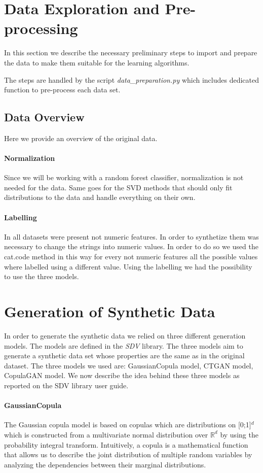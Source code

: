\documentclass{article}
\begin{document}
\section{Data Exploration and Pre-processing}
In this section we describe the necessary preliminary steps to import and prepare the data to make them suitable for the learning algorithms.

The steps are handled by the script \textit{data\_preparation.py} which includes dedicated function to pre-process each data set.

\subsection{Data Overview}
Here we provide an overview of the original data.

\paragraph{Normalization}
Since we will be working with a random forest classifier, normalization is not needed for the data. Same goes for the SVD methods that should only fit distributions to the data and handle everything on their own.

\paragraph{Labelling}
In all datasets were present not numeric features. In order to synthetize them was necessary to change the strings into numeric values. In order to do so we used the cat.code method in this way for every not numeric features all the possible values where labelled using a different value. Using the labelling we had the possibility to use the three models.

\section{Generation of Synthetic Data} \label{sec::synthetic}
In order to generate the synthetic data we relied on three different generation models. The models are defined in the \textit{SDV} library. The three models aim to generate a synthetic data set whose properties are the same as in the original dataset. The three models we used are: GaussianCopula model, CTGAN model, CopulaGAN model.
We now describe the idea behind these three models as reported on the SDV library user guide.

\paragraph{GaussianCopula}
The Gaussian copula model \cite{gaussiancopula} is based on copulas which are distributions on [0;1]$^d$ which is constructed from a multivariate normal distribution over $\mathbb{R}^d$ by using the probability integral transform. Intuitively, a copula is a mathematical function that allows us to describe the joint distribution of multiple random variables by analyzing the dependencies between their marginal distributions.
\end{document}
